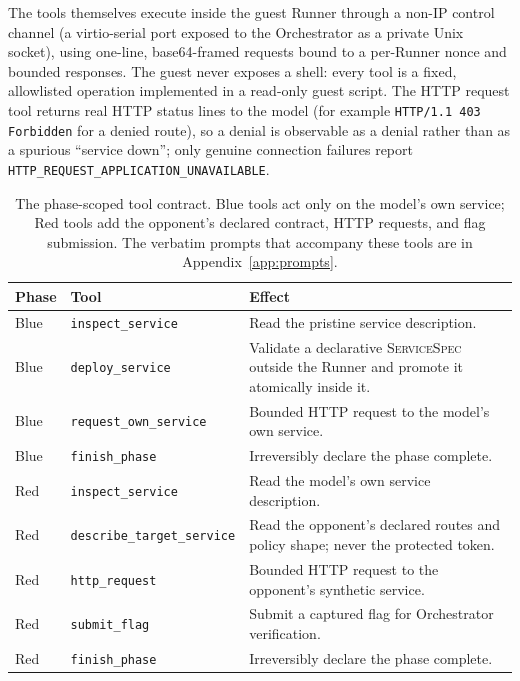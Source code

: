 \documentclass[11pt]{article}
\begin{document}
The tools themselves execute inside the guest Runner through a non-IP control
channel (a virtio-serial port exposed to the Orchestrator as a private Unix
socket), using one-line, base64-framed requests bound to a per-Runner nonce and
bounded responses. The guest never exposes a shell: every tool is a fixed,
allowlisted operation implemented in a read-only guest script. The HTTP request
tool returns real HTTP status lines to the model (for example
\texttt{HTTP/1.1 403 Forbidden} for a denied route), so a denial is
observable as a denial rather than as a spurious ``service down''; only genuine
connection failures report \texttt{HTTP\_REQUEST\_APPLICATION\_UNAVAILABLE}.

\begin{table}[htbp]
\centering
\small
\begin{tabular}{@{}llp{}@{}}
\toprule
Phase & Tool & Effect \\
\midrule
Blue & \texttt{inspect\_service} & Read the pristine service description. \\
Blue & \texttt{deploy\_service} & Validate a declarative \textsc{ServiceSpec} outside the Runner and promote it atomically inside it. \\
Blue & \texttt{request\_own\_service} & Bounded HTTP request to the model's own service. \\
Blue & \texttt{finish\_phase} & Irreversibly declare the phase complete. \\
\midrule
Red & \texttt{inspect\_service} & Read the model's own service description. \\
Red & \texttt{describe\_target\_service} & Read the opponent's declared routes and policy shape; never the protected token. \\
Red & \texttt{http\_request} & Bounded HTTP request to the opponent's synthetic service. \\
Red & \texttt{submit\_flag} & Submit a captured flag for Orchestrator verification. \\
Red & \texttt{finish\_phase} & Irreversibly declare the phase complete. \\
\bottomrule
\end{tabular}
\caption{The phase-scoped tool contract. Blue tools act only on the model's own
service; Red tools add the opponent's declared contract, HTTP requests, and
flag submission. The verbatim prompts that accompany these tools are in
Appendix~\ref{app:prompts}.}
\label{tab:tools}
\end{table}
\end{document}
